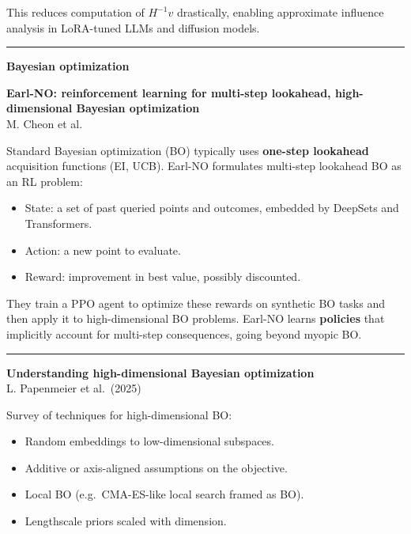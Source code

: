 \documentclass[a5paper]{article}
\providecommand{\tightlist}{%
  \setlength{\itemsep}{0pt}\setlength{\parskip}{0pt}}
\def\subsection#1{{\par\bigskip\goodbreak\large\bfseries #1\par}}
\begin{document}
This reduces computation of $H^{-1}v$ drastically, enabling approximate
influence analysis in LoRA-tuned LLMs and diffusion models.

\begin{center}\rule{0.5\linewidth}{0.5pt}\end{center}

\subsection{Bayesian optimization}\label{bayesian-optimization}

\textbf{Earl-NO: reinforcement learning for multi-step lookahead,
high-dimensional Bayesian optimization}\\
M. Cheon et al.

Standard Bayesian optimization (BO) typically uses \textbf{one-step
lookahead} acquisition functions (EI, UCB). Earl-NO formulates
multi-step lookahead BO as an RL problem:

\begin{itemize}
\tightlist
\item
  State: a set of past queried points and outcomes, embedded by DeepSets
  and Transformers.
\item
  Action: a new point to evaluate.
\item
  Reward: improvement in best value, possibly discounted.
\end{itemize}

They train a PPO agent to optimize these rewards on synthetic BO tasks
and then apply it to high-dimensional BO problems. Earl-NO learns
\textbf{policies} that implicitly account for multi-step consequences,
going beyond myopic BO.

\begin{center}\rule{0.5\linewidth}{0.5pt}\end{center}

\textbf{Understanding high-dimensional Bayesian optimization}\\
L. Papenmeier et al.~(2025)

Survey of techniques for high-dimensional BO:

\begin{itemize}
\tightlist
\item
  Random embeddings to low-dimensional subspaces.
\item
  Additive or axis-aligned assumptions on the objective.
\item
  Local BO (e.g.~CMA-ES-like local search framed as BO).
\item
  Lengthscale priors scaled with dimension.
\end{itemize}
\end{document}
